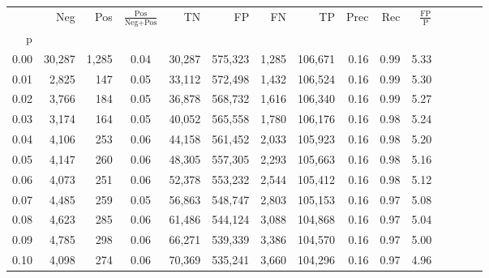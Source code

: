\begin{tabular}{rrrcrrrrrrrrrrr}
\toprule
{} &     Neg &    Pos & $\frac{\text{Pos}}{\text{Neg}+\text{Pos}}$ &       TN &       FP &       FN &       TP &  Prec &   Rec & $\frac{\text{FP}}{\text{P}}$ \\
p    &         &        &                                            &          &          &          &          &       &       &                              \\
\midrule
0.00 &  30,287 &  1,285 &                                       0.04 &   30,287 &  575,323 &    1,285 &  106,671 &  0.16 &  0.99 &                         5.33 \\
0.01 &   2,825 &    147 &                                       0.05 &   33,112 &  572,498 &    1,432 &  106,524 &  0.16 &  0.99 &                         5.30 \\
0.02 &   3,766 &    184 &                                       0.05 &   36,878 &  568,732 &    1,616 &  106,340 &  0.16 &  0.99 &                         5.27 \\
0.03 &   3,174 &    164 &                                       0.05 &   40,052 &  565,558 &    1,780 &  106,176 &  0.16 &  0.98 &                         5.24 \\
0.04 &   4,106 &    253 &                                       0.06 &   44,158 &  561,452 &    2,033 &  105,923 &  0.16 &  0.98 &                         5.20 \\
0.05 &   4,147 &    260 &                                       0.06 &   48,305 &  557,305 &    2,293 &  105,663 &  0.16 &  0.98 &                         5.16 \\
0.06 &   4,073 &    251 &                                       0.06 &   52,378 &  553,232 &    2,544 &  105,412 &  0.16 &  0.98 &                         5.12 \\
0.07 &   4,485 &    259 &                                       0.05 &   56,863 &  548,747 &    2,803 &  105,153 &  0.16 &  0.97 &                         5.08 \\
0.08 &   4,623 &    285 &                                       0.06 &   61,486 &  544,124 &    3,088 &  104,868 &  0.16 &  0.97 &                         5.04 \\
0.09 &   4,785 &    298 &                                       0.06 &   66,271 &  539,339 &    3,386 &  104,570 &  0.16 &  0.97 &                         5.00 \\
0.10 &   4,098 &    274 &                                       0.06 &   70,369 &  535,241 &    3,660 &  104,296 &  0.16 &  0.97 &                         4.96 \\

\end{tabular}
